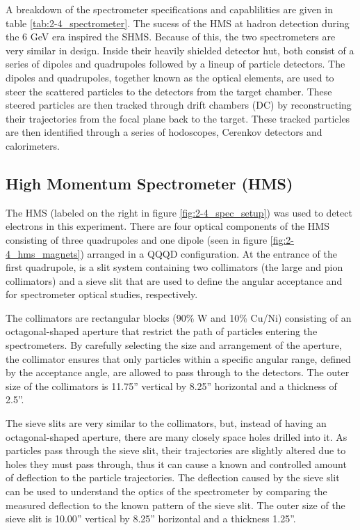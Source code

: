 \documentclass[
]{report}
\begin{document}
A breakdown of the spectrometer specifications and capablilities are
given in table \ref{tab:2-4_spectrometer}. The sucess of the HMS at
hadron detection during the 6 GeV era inspired the SHMS. Because of
this, the two spectrometers are very similar in design. Inside their
heavily shielded detector hut, both consist of a series of dipoles and
quadrupoles followed by a lineup of particle detectors. The dipoles and
quadrupoles, together known as the optical elements, are used to steer
the scattered particles to the detectors from the target chamber. These
steered particles are then tracked through drift chambers (DC) by
reconstructing their trajectories from the focal plane back to the
target. These tracked particles are then identified through a series of
hodoscopes, Cerenkov detectors and calorimeters.



\hypertarget{high-momentum-spectrometer-hms}{%
\subsection{High Momentum Spectrometer
(HMS)}\label{high-momentum-spectrometer-hms}}

The HMS (labeled on the right in figure \ref{fig:2-4_spec_setup}) was
used to detect electrons in this experiment. There are four optical
components of the HMS consisting of three quadrupoles and one dipole
(seen in figure \ref{fig:2-4_hms_magnets}) arranged in a QQQD
configuration. At the entrance of the first quadrupole, is a slit system
containing two collimators (the large and pion collimators) and a sieve
slit that are used to define the angular acceptance and for spectrometer
optical studies, respectively.



The collimators are rectangular blocks (90\% W and 10\% Cu/Ni)
consisting of an octagonal-shaped aperture that restrict the path of
particles entering the spectrometers. By carefully selecting the size
and arrangement of the aperture, the collimator ensures that only
particles within a specific angular range, defined by the acceptance
angle, are allowed to pass through to the detectors. The outer size of
the collimators is 11.75'' vertical by 8.25'' horizontal and a thickness
of 2.5''.

The sieve slits are very similar to the collimators, but, instead of
having an octagonal-shaped aperture, there are many closely space holes
drilled into it. As particles pass through the sieve slit, their
trajectories are slightly altered due to holes they must pass through,
thus it can cause a known and controlled amount of deflection to the
particle trajectories. The deflection caused by the sieve slit can be
used to understand the optics of the spectrometer by comparing the
measured deflection to the known pattern of the sieve slit. The outer
size of the sieve slit is 10.00'' vertical by 8.25'' horizontal and a
thickness 1.25''.
\end{document}
